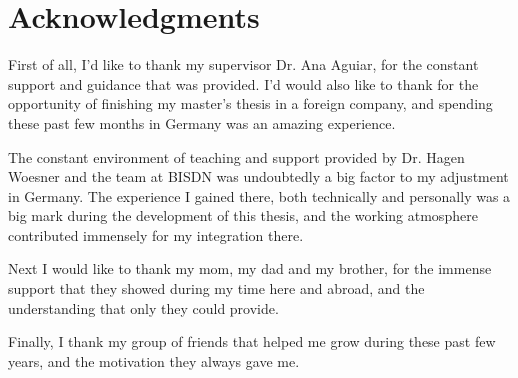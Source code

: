 \chapter*{Acknowledgments}

First of all, I'd like to thank my supervisor Dr. Ana Aguiar, for the constant support and guidance that was provided. I'd would also like to thank for the 
opportunity of finishing my master's thesis in a foreign company, and spending these past few months in Germany was an amazing experience.

\par The constant environment of teaching and support provided by Dr. Hagen Woesner and the team at BISDN was undoubtedly a big factor to my adjustment in Germany.
The experience I gained there, both technically and personally was a big mark during the development of this thesis, and the working atmosphere contributed immensely
for my integration there.

\par Next I would like to thank my mom, my dad and my brother, for the immense support that they showed during my time here and abroad, and the understanding that 
only they could provide.

\par Finally, I thank my group of friends that helped me grow during these past few years, and the motivation they always gave me.

\vspace{10mm}
